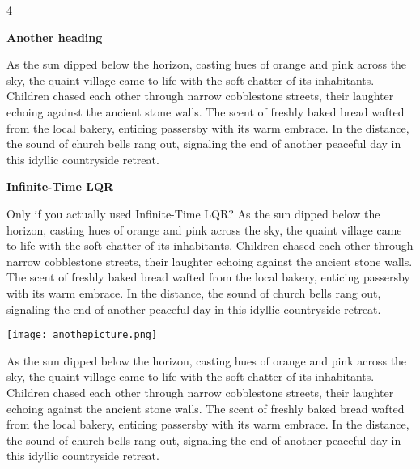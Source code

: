 \documentclass[a0]{4by3}
\newcommand{\NumColumns}{4}
\begin{document}
\begin{minipage}{\linewidth + 2\fboxsep}
\begin{multicols*}{\NumColumns}
            
        
        \begin{center}
        \vspace{2cm}
        \LARGE{\textbf{Another heading}}
        \end{center}
            \large
        
            As the sun dipped below the horizon, casting hues of orange and pink across the sky, the quaint village came to life with the soft chatter of its inhabitants. Children chased each other through narrow cobblestone streets, their laughter echoing against the ancient stone walls. The scent of freshly baked bread wafted from the local bakery, enticing passersby with its warm embrace. In the distance, the sound of church bells rang out, signaling the end of another peaceful day in this idyllic countryside retreat.


        \columnbreak
        \begin{center}
        \LARGE{\textbf{Infinite-Time LQR}}
        \end{center}

            Only if you actually used Infinite-Time LQR?
As the sun dipped below the horizon, casting hues of orange and pink across the sky, the quaint village came to life with the soft chatter of its inhabitants. Children chased each other through narrow cobblestone streets, their laughter echoing against the ancient stone walls. The scent of freshly baked bread wafted from the local bakery, enticing passersby with its warm embrace. In the distance, the sound of church bells rang out, signaling the end of another peaceful day in this idyllic countryside retreat.


    
        \begin{center}
          \texttt{[image: anothepicture.png]}
        \end{center}
        
        As the sun dipped below the horizon, casting hues of orange and pink across the sky, the quaint village came to life with the soft chatter of its inhabitants. Children chased each other through narrow cobblestone streets, their laughter echoing against the ancient stone walls. The scent of freshly baked bread wafted from the local bakery, enticing passersby with its warm embrace. In the distance, the sound of church bells rang out, signaling the end of another peaceful day in this idyllic countryside retreat.


\end{multicols*}
\end{minipage}
\end{document}
